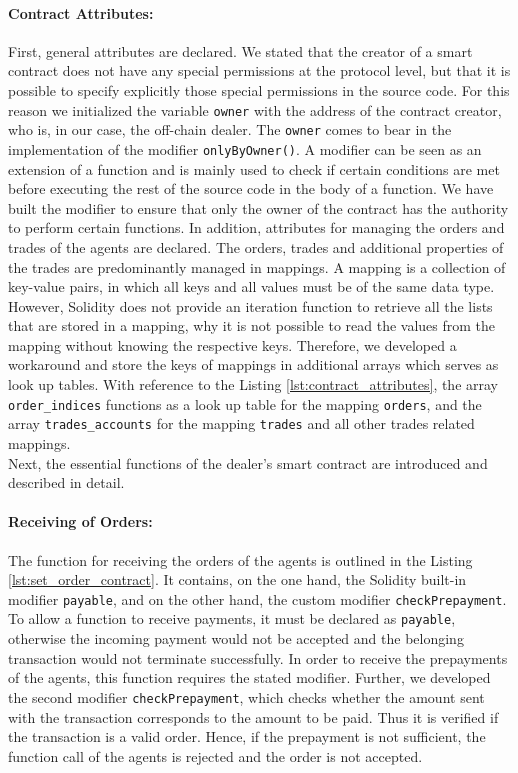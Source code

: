 \paragraph{Contract Attributes:} First, general attributes are declared.
We stated that the creator of a smart contract does not have any special permissions at the protocol level, but
that it is possible to specify explicitly those special permissions in the source code.  
For this reason we initialized the variable \verb|owner| with the address of the contract creator, who is, in our case,
the off-chain dealer. The \verb|owner| comes to bear in the implementation of the modifier \verb|onlyByOwner()|.
A modifier can be seen as an extension of a function and is mainly used to
check if certain conditions are met before executing the rest of the source code in the body of a function.
We have built the modifier to ensure that only the owner of the contract has the authority to perform certain functions.
In addition, attributes for managing the orders and trades of the agents are declared. 
The orders, trades and additional properties of the trades are predominantly managed in mappings.
A mapping is a collection of key-value pairs, in which all keys and all values must be of the same 
data type. However, Solidity does not provide an iteration
function to retrieve all the lists that are stored in a mapping, why it is not possible 
to read the values from the mapping without knowing the respective keys.
Therefore, we developed a workaround and store the keys of mappings in additional arrays which serves 
as look up tables.
With reference to the Listing \ref{lst:contract_attributes}, the array \verb|order_indices| functions as a 
look up table for the mapping \verb|orders|, and the array \verb|trades_accounts| for the mapping 
\verb|trades| and all other trades related mappings. \\

Next, the essential functions of the dealer's smart contract are introduced and described in detail.

\paragraph{Receiving of Orders:} The function for receiving the orders of the agents is outlined in the Listing \ref{lst:set_order_contract}.
It contains, on the one hand, the Solidity built-in modifier \verb|payable|, and on the other hand, the custom
modifier \verb|checkPrepayment|. To allow a function to receive payments, it must be declared as \verb|payable|,
otherwise the incoming payment would not be accepted and the belonging transaction would not terminate successfully.
In order to receive the prepayments of the agents, this function requires the stated modifier.
Further, we developed the second modifier \verb|checkPrepayment|, which checks whether the amount sent with the 
transaction corresponds to the amount to be paid. Thus it is verified if the transaction is a valid order.
Hence, if the prepayment is not sufficient, the function call of the agents is rejected and 
the order is not accepted.


